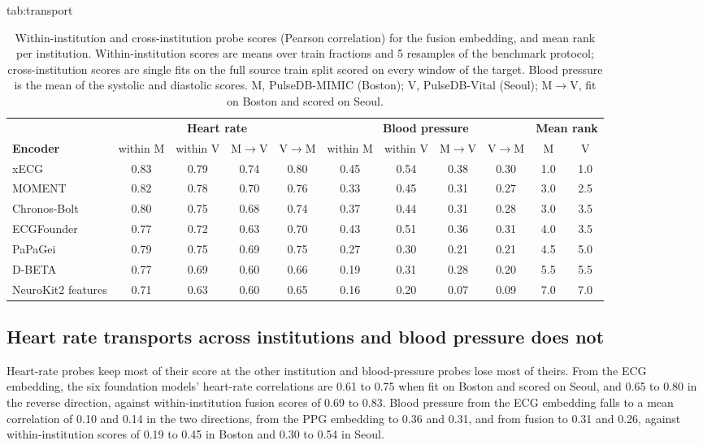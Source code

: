\documentclass[pmlr,twocolumn,10pt]{jmlr}
\newcommand{\domainmodel}{xECG}
\newcommand{\tsmodel}{MOMENT}
\begin{document}
\begin{table}[t]
\floatconts
  {tab:transport}%
  {\caption{Within-institution and cross-institution probe scores (Pearson correlation) for the fusion embedding, and mean rank per institution. Within-institution scores are means over train fractions and 5 resamples of the benchmark protocol; cross-institution scores are single fits on the full source train split scored on every window of the target. Blood pressure is the mean of the systolic and diastolic scores. M, PulseDB-MIMIC (Boston); V, PulseDB-Vital (Seoul); M$\to$V, fit on Boston and scored on Seoul.}}%
  {\footnotesize\setlength{\tabcolsep}{3pt}
  \begin{tabular*}{\linewidth}{@{\extracolsep{\fill}}lcccccccccc@{}}
  \toprule
  & \multicolumn{4}{c}{\textbf{Heart rate}} & \multicolumn{4}{c}{\textbf{Blood pressure}} & \multicolumn{2}{c}{\textbf{Mean rank}} \\
  \cmidrule(lr){2-5}\cmidrule(lr){6-9}\cmidrule(lr){10-11}
  \textbf{Encoder} & within M & within V & M$\to$V & V$\to$M & within M & within V & M$\to$V & V$\to$M & M & V \\
  \midrule
  \domainmodel{} & 0.83 & 0.79 & 0.74 & 0.80 & 0.45 & 0.54 & 0.38 & 0.30 & 1.0 & 1.0 \\
  \tsmodel{} & 0.82 & 0.78 & 0.70 & 0.76 & 0.33 & 0.45 & 0.31 & 0.27 & 3.0 & 2.5 \\
  Chronos-Bolt & 0.80 & 0.75 & 0.68 & 0.74 & 0.37 & 0.44 & 0.31 & 0.28 & 3.0 & 3.5 \\
  ECGFounder & 0.77 & 0.72 & 0.63 & 0.70 & 0.43 & 0.51 & 0.36 & 0.31 & 4.0 & 3.5 \\
  PaPaGei & 0.79 & 0.75 & 0.69 & 0.75 & 0.27 & 0.30 & 0.21 & 0.21 & 4.5 & 5.0 \\
  D-BETA & 0.77 & 0.69 & 0.60 & 0.66 & 0.19 & 0.31 & 0.28 & 0.20 & 5.5 & 5.5 \\
  NeuroKit2 features & 0.71 & 0.63 & 0.60 & 0.65 & 0.16 & 0.20 & 0.07 & 0.09 & 7.0 & 7.0 \\
  \bottomrule
  \end{tabular*}}
\end{table}

\subsection{Heart rate transports across institutions and blood pressure does not}
\label{sec:tasks}

Heart-rate probes keep most of their score at the other institution and blood-pressure probes lose most of theirs. From the ECG embedding, the six foundation models' heart-rate correlations are 0.61 to 0.75 when fit on Boston and scored on Seoul, and 0.65 to 0.80 in the reverse direction, against within-institution fusion scores of 0.69 to 0.83. Blood pressure from the ECG embedding falls to a mean correlation of 0.10 and 0.14 in the two directions, from the PPG embedding to 0.36 and 0.31, and from fusion to 0.31 and 0.26, against within-institution scores of 0.19 to 0.45 in Boston and 0.30 to 0.54 in Seoul.
\end{document}
